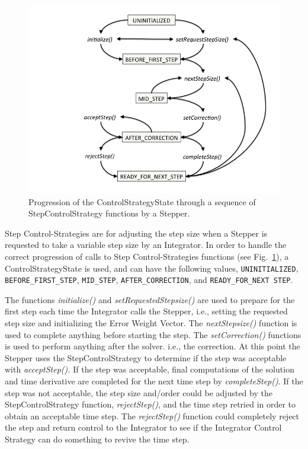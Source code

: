 \begin{figure}
\centering{}\includegraphics[width=5in]{figures/StepControlStrategy}\caption{Progression of the ControlStrategyState through a sequence of StepControlStrategy
functions by a Stepper.\label{rythmos:fig:StepControlStateProgression}}
\end{figure}
Step Control-Strategies are for adjusting the step size when a Stepper
is requested to take a variable step size by an Integrator. In order
to handle the correct progression of calls to Step Control-Strategies
functions (see Fig.~\ref{rythmos:fig:StepControlStateProgression}),
a ControlStrategyState is used, and can have the following values,
\texttt{\textsc{UNINITIALIZED}}, \texttt{\textsc{BEFORE\_FIRST\_STEP}},
\texttt{\textsc{MID\_STEP}}, \texttt{\textsc{AFTER\_CORRECTION}},
and \texttt{\textsc{READY\_FOR\_NEXT STEP}}.

The functions \emph{initialize()} and \emph{setRequestedStepsize()}
are used to prepare for the first step each time the Integrator calls
the Stepper, i.e., setting the requested step size and initializing
the Error Weight Vector. The \emph{nextStepsize() }function is used
to complete anything before starting the step. The \emph{setCorrection()}
functions is used to perform anything after the solver. i.e., the
correction. At this point the Stepper uses the StepControlStrategy
to determine if the step was acceptable with \emph{acceptStep(). }If
the step was acceptable, final computations of the solution and time
derivative are completed for the next time step by \emph{completeStep()}.
If the step was not acceptable, the step size and/order could be adjusted
by the StepControlStrategy function, \emph{rejectStep()}, and the
time step retried in order to obtain an acceptable time step. The\emph{
rejectStep()} function could completely reject the step and return
control to the Integrator to see if the Integrator Control Strategy
can do something to revive the time step.
